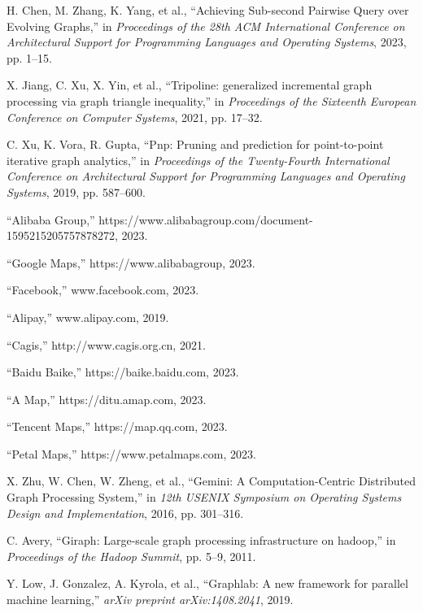 \documentclass[lettersize,journal]{IEEEtran}
\begin{document}
\begin{thebibliography}{100}


H. Chen, M. Zhang, K. Yang, et al., ``Achieving Sub-second Pairwise Query over Evolving Graphs,'' in \textit{Proceedings of the 28th ACM International Conference on Architectural Support for Programming Languages and Operating Systems}, 2023, pp. 1--15.

X. Jiang, C. Xu, X. Yin, et al., ``Tripoline: generalized incremental graph processing via graph triangle inequality,'' in \textit{Proceedings of the Sixteenth European Conference on Computer Systems}, 2021, pp. 17--32.

C. Xu, K. Vora, R. Gupta, ``Pnp: Pruning and prediction for point-to-point iterative graph analytics,'' in \textit{Proceedings of the Twenty-Fourth International Conference on Architectural Support for Programming Languages and Operating Systems}, 2019, pp. 587--600.

``Alibaba Group,'' https://www.alibabagroup.com/document-1595215205757878272, 2023.


``Google Maps,'' https://www.alibabagroup, 2023.

``Facebook,'' www.facebook.com, 2023.

``Alipay,'' www.alipay.com, 2019.

``Cagis,'' http://www.cagis.org.cn, 2021.

``Baidu Baike,'' https://baike.baidu.com, 2023.

``A Map,'' https://ditu.amap.com, 2023.

``Tencent Maps,'' https://map.qq.com, 2023.

``Petal Maps,'' https://www.petalmaps.com, 2023.

X. Zhu, W. Chen, W. Zheng, et al., ``Gemini: A {Computation-Centric} Distributed Graph Processing System,'' in \textit{12th USENIX Symposium on Operating Systems Design and Implementation}, 2016, pp. 301--316.

C. Avery, ``Giraph: Large-scale graph processing infrastructure on hadoop,'' in \textit{Proceedings of the Hadoop Summit}, pp. 5--9, 2011.

Y. Low, J. Gonzalez, A. Kyrola, et al., ``Graphlab: A new framework for parallel machine learning,'' \textit{arXiv preprint arXiv:1408.2041}, 2019.


\end{thebibliography}
\end{document}
